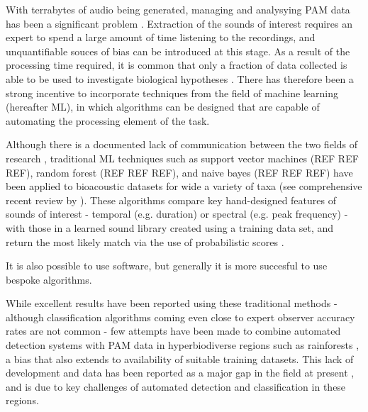 \documentclass[11pt]{article}
\begin{document}
With terrabytes of audio being generated, managing and analysying PAM data has been a significant problem \citep{villanueva2012pumilio,shonfield2017autonomous}. Extraction of the sounds of interest requires an expert to spend a large amount of time listening to the recordings, and unquantifiable souces of bias can be introduced at this stage. As a result of the processing time required, it is common that only a fraction of data collected is able to be used to investigate biological hypotheses \citep{kobayasi2012classification}. There has therefore been a strong incentive to incorporate techniques from the field of machine learning (hereafter ML), in which algorithms can be designed that are capable of automating the processing element of the task. 


Although there is a documented lack of communication between the two fields of research \citep{thessen2016adoption}, traditional ML techniques such as support vector machines (REF REF REF), random forest (REF REF REF), and naive bayes (REF REF REF) have been applied to bioacoustic datasets for wide a variety of taxa (see comprehensive recent review by \cite{knight2017recommendations}). These algorithms compare key hand-designed features of sounds of interest - temporal (e.g. duration) or spectral (e.g. peak frequency) - with those in a learned sound library created using a training data set, and return the most likely match via the use of probabilistic scores \citep{reason2016recommendations}. 

It is also possible to use software, but generally it is more succesful to use bespoke algorithms.

While excellent results have been reported using these traditional methods - although classification algorithms coming even close to expert observer accuracy rates are not common \citep{ovaskainen2018animal} - few attempts have been made to combine automated detection systems with PAM data in hyperbiodiverse regions such as rainforests \citep{browning2017passive}, a bias that also extends to availability of suitable training datasets. This lack of development and data has been reported as a major gap in the field at present \citep{browning2017passive}, and is due to key challenges of automated detection and classification in these regions. 
\end{document}

